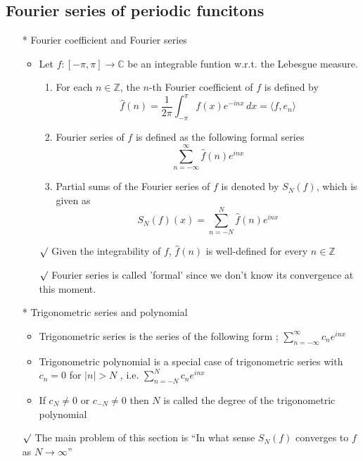 \documentclass[12pt]{article}
\newcommand{\rmk}{$\surd$}
\begin{document}
\subsection{Fourier series of periodic funcitons}
\smallskip
\begin{itemize}
    \item[*] Fourier coefficient and Fourier series
    \begin{itemize}
        \item Let $f:[-\pi, \pi]\rightarrow \mathbb{C}$ be an integrable funtion w.r.t. the Lebesgue measure. 
        \begin{enumerate}
            \item For each $n\in \mathbb{Z}$, the $n$-th Fourier coefficient of $f$ is defined by \begin{equation*}
                \hat{f}(n)=\frac{1}{2\pi}\int_{-\pi}^\pi f(x)e^{-inx}\, dx=\langle f, e_n \rangle
            \end{equation*}
            \item Fourier series of $f$ is defined as the following formal series \begin{equation*}
                \sum_{n=-\infty}^\infty \hat{f}(n)e^{inx}
            \end{equation*}
            \item Partial sums of the Fourier series of $f$ is denoted by $S_N(f)$, which is given as \begin{equation*}
                S_N(f)(x)=\sum_{n=-N}^N \hat{f}(n)e^{inx}
            \end{equation*}
        \end{enumerate}
        \item[\rmk] Given the integrability of $f$, $\hat{f}(n)$ is well-defined for every $n\in \mathbb{Z}$
        \item[\rmk] Fourier series is called 'formal' since we don't know its convergence at this moment.  
    \end{itemize}
    \item[*] Trigonometric series and polynomial
    \begin{itemize}
        \item Trigonometric series is the series of the following form ; $\sum_{n=-\infty}^\infty c_n e^{inx}$
        \item Trigonometric polynomial is a special case of trigonometric series with $c_n=0$ for $|n|>N$ , i.e. $\sum_{n=-N}^N c_n e^{inx}$
        \item If $c_N\neq 0$ or $c_{-N}\neq0$ then $N$ is called the degree of the trigonometric polynomial
    \end{itemize}
    \item[\rmk] The main problem of this section is ``In what sense $S_N(f)$ converges to $f$ as $N\rightarrow \infty$''
\end{itemize}
\smallskip
\end{document}
